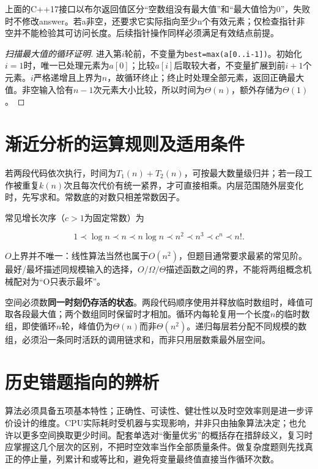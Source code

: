 上面的C++17接口以布尔返回值区分``空数组没有最大值''和``最大值恰为0''，失败时不修改answer。若a非空，还要求它实际指向至少n个有效元素；仅检查指针非空并不能检验其可访问长度。后续指针操作同样必须满足有效结点前提。

\begin{proof}[扫描最大值的循环证明]

进入第\(i\)轮前，不变量为\texttt{best=\allowbreak{}max(\allowbreak{}a[0..i-1])\allowbreak{}}。初始化\(i=1\)时，唯一已处理元素为\(a[0]\)；比较\(a[i]\)后取较大者，不变量扩展到前\(i+1\)个元素。\(i\)严格递增且上界为\(n\)，故循环终止；终止时处理全部元素，返回正确最大值。非空输入恰有\(n-1\)次元素大小比较，所以时间为\(\Theta(n)\)，额外存储为\(\Theta(1)\)。

\end{proof}

\section{渐近分析的运算规则及适用条件}\label{DS01-rules}

\begin{theorem}

若两段代码依次执行，时间为\(T_1(n)+T_2(n)\)，可按最大数量级归并；若一段工作被重复\(k(n)\)次且每次代价有统一紧界，才可直接相乘。内层范围随外层变化时，先写求和。常数底的对数只相差常数因子。

\end{theorem}

常见增长次序（\(c>1\)为固定常数）为

\[1\prec\log n\prec n\prec n\log n\prec n^2\prec n^3\prec c^n\prec n!.\]

\(O\)上界并不唯一：线性算法当然也属于\(O(n^2)\)，但题目通常要求最紧的常见阶。最好/最坏描述同规模输入的选择，\(O/\Omega/\Theta\)描述函数之间的界，不能将两组概念机械配对为``O只表示最坏''。

空间必须数\textbf{同一时刻仍存活的状态}。两段代码顺序使用并释放临时数组时，峰值可取各段最大值；两个数组同时保留时才相加。循环内每轮复用一个长度\(n\)的临时数组，即使循环\(n\)轮，峰值仍为\(\Theta(n)\)而非\(\Theta(n^2)\)。递归每层若分配不同规模的数组，必须沿一条同时活跃的调用链求和，而非只用层数乘最外层空间。

\section{历史错题指向的辨析}\label{DS01-errors}

算法必须具备五项基本特性；正确性、可读性、健壮性以及时空效率则是进一步评价设计的维度。CPU实际耗时受机器与实现影响，并非只由抽象算法决定；也允许以更多空间换取更少时间。配套单选对``衡量优劣''的概括存在措辞歧义，复习时应掌握这几个层次的区别，不把时空效率当作全部质量条件。做复杂度题则先找真正的停止量，列累计和或等比和，避免将变量最终值直接当作循环次数。

